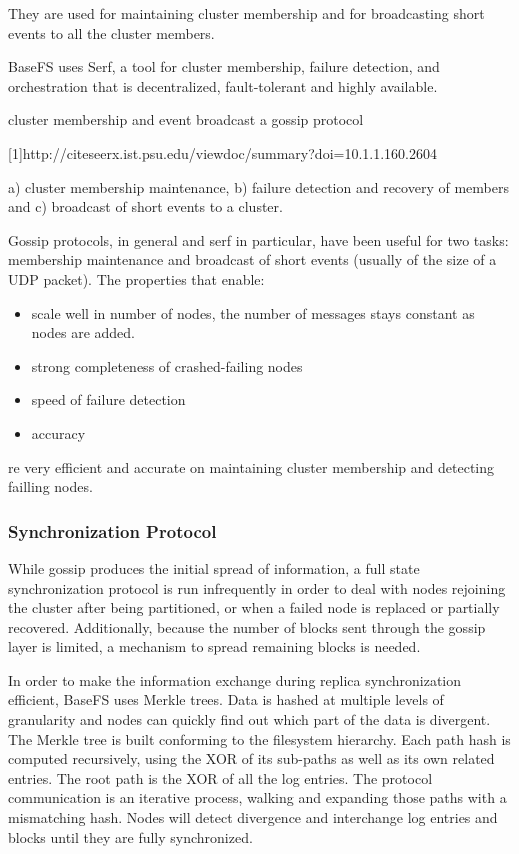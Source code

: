 \documentclass{sig-alternate}
\begin{document}


They are used for maintaining cluster membership and for broadcasting short events to all the cluster members.

BaseFS uses Serf, a tool for cluster membership, failure detection, and orchestration that is decentralized, fault-tolerant and highly available.


cluster membership and event broadcast a gossip protocol

[1]http://citeseerx.ist.psu.edu/viewdoc/summary?doi=10.1.1.160.2604

a) cluster membership maintenance, b) failure detection and recovery of members and c) broadcast of short events to a cluster.



Gossip protocols, in general and serf in particular, have been useful for two tasks: membership maintenance and broadcast of short events (usually of the size of a UDP packet). The properties that enable:

\begin{itemize}
\item scale well in number of nodes, the number of messages stays constant as nodes are added. 
\item strong completeness of crashed-failing nodes
\item speed of failure detection
\item accuracy
\end{itemize}



re very efficient and accurate on maintaining cluster membership and detecting failling nodes.


\subsubsection{Synchronization Protocol}

While gossip produces the initial spread of information, a full state synchronization protocol is run infrequently in order to deal with nodes rejoining the cluster after being partitioned, or when a failed node is replaced or partially recovered. Additionally, because the number of blocks sent through the gossip layer is limited, a mechanism to spread remaining blocks is needed.

In order to make the information exchange during replica synchronization efficient, BaseFS uses Merkle trees. Data is hashed at multiple levels of granularity and nodes can quickly find out which part of the data is divergent. The Merkle tree is built conforming to the filesystem hierarchy. Each path hash is computed recursively, using the XOR of its sub-paths as well as its own related entries. The root path is the XOR of all the log entries. The protocol communication is an iterative process, walking and expanding those paths with a mismatching hash. Nodes will detect divergence and interchange log entries and blocks until they are fully synchronized.
\end{document}
